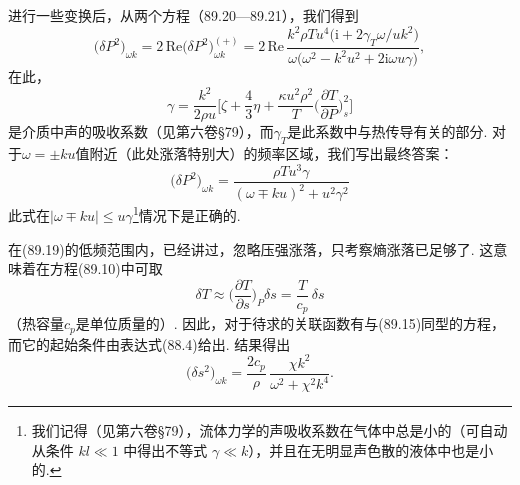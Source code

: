 进行一些变换后，从两个方程（89.20—89.21），我们得到
\begin{equation}
\bigl(\delta P^{2}\bigr)_{\omega k}=2\,\mathrm{Re}\bigl(\delta P^{2}\bigr)^{(+)}_{\omega k}=2\,\mathrm{Re}\,\frac{k^{2}\rho Tu^{4}\bigl(\mathrm{i}+2\gamma_{T}\omega/uk^{2}\bigr)}{\omega\bigl(\omega^{2}-k^{2}u^{2}+2\mathrm{i}\omega u\gamma\bigr)},
\end{equation}
在此，
\begin{equation}
\gamma=\frac{k^{2}}{2\rho u}\biggl[\zeta+\frac{4}{3}\eta+\frac{\kappa u^{2}\rho^{2}}{T}\biggl(\frac{\partial T}{\partial P}\biggr)^{2}_{s}\biggr]
\end{equation}
是介质中声的吸收系数（见第六卷§79），而$\gamma_{T}$是此系数中与热传导有关的部分. 对于$\omega=\pm ku$值附近（此处涨落特别大）的频率区域，我们写出最终答案：
\begin{equation}
\bigl(\delta P^{2}\bigr)_{\omega k}=\frac{\rho Tu^{3}\gamma}{(\omega\mp ku)^{2}+u^{2}\gamma^{2}}
\end{equation}
此式在$|\omega\mp ku|\leqslant u\gamma$\footnote{我们记得（见第六卷§79），流体力学的声吸收系数在气体中总是小的（可自动从条件 $kl\ll 1$ 中得出不等式 $\gamma\ll k$），并且在无明显声色散的液体中也是小的.}情况下是正确的.

在(89.19)的低频范围内，已经讲过，忽略压强涨落，只考察熵涨落已足够了. 这意味着在方程(89.10)中可取
\begin{equation*}
\delta T\approx\biggl(\frac{\partial T}{\partial s}\biggr)_{P}\delta s=\frac{T}{c_{p}}\,\delta s
\end{equation*}
（热容量$c_{p}$是单位质量的）. 因此，对于待求的关联函数有与(89.15)同型的方程，而它的起始条件由表达式(88.4)给出. 结果得出
\begin{equation}
\bigl(\delta s^{2}\bigr)_{\omega k}=\frac{2c_{p}}{\rho}\,\frac{\chi k^{2}}{\omega^{2}+\chi^{2}k^{4}}.
\end{equation}

